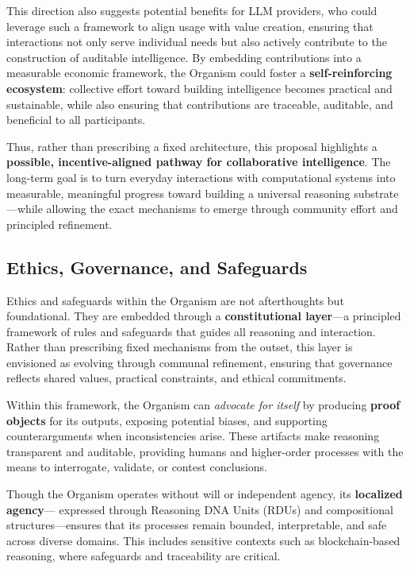 \documentclass[12pt]{article}
\begin{document}
This direction also suggests potential benefits for LLM providers, who could leverage such a framework to align usage with value creation, ensuring that interactions not only serve individual needs but also actively contribute to the construction of auditable intelligence. By embedding contributions into a measurable economic framework, the Organism could foster a \textbf{self-reinforcing ecosystem}: collective effort toward building intelligence becomes practical and sustainable, while also ensuring that contributions are traceable, auditable, and beneficial to all participants.  

Thus, rather than prescribing a fixed architecture, this proposal highlights a \textbf{possible, incentive-aligned pathway for collaborative intelligence}. The long-term goal is to turn everyday interactions with computational systems into measurable, meaningful progress toward building a universal reasoning substrate—while allowing the exact mechanisms to emerge through community effort and principled refinement.  

\subsection{Ethics, Governance, and Safeguards}

Ethics and safeguards within the Organism are not afterthoughts but foundational. They are embedded through a \textbf{constitutional layer}—a principled framework of rules and safeguards that guides all reasoning and interaction. Rather than prescribing fixed mechanisms from the outset, this layer is envisioned as evolving through communal refinement, ensuring that governance reflects shared values, practical constraints, and ethical commitments.  

Within this framework, the Organism can \textit{advocate for itself} by producing \textbf{proof objects} for its outputs, exposing potential biases, and supporting counterarguments when inconsistencies arise. These artifacts make reasoning transparent and auditable, providing humans and higher-order processes with the means to interrogate, validate, or contest conclusions.  

Though the Organism operates without will or independent agency, its \textbf{localized agency}— expressed through Reasoning DNA Units (RDUs) and compositional structures—ensures that its processes remain bounded, interpretable, and safe across diverse domains. This includes sensitive contexts such as blockchain-based reasoning, where safeguards and traceability are critical.  
\end{document}
